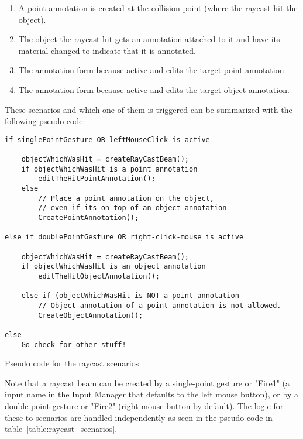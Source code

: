 \begin{enumerate}
    \item A point annotation is created at the collision point (where the raycast hit the object).
    \item The object the raycast hit gets an annotation attached to it and have its material changed to indicate that it is annotated.
    \item The annotation form because active and edits the target point annotation.
    \item The annotation form because active and edits the target object annotation.
\end{enumerate}
 
These scenarios and which one of them is triggered can be summarized with the following pseudo code:

\begin{table}
\label{table:raycast_scenarios}
\begin{lstlisting}
if singlePointGesture OR leftMouseClick is active
    
    objectWhichWasHit = createRayCastBeam();
    if objectWhichWasHit is a point annotation
        editTheHitPointAnnotation();
    else 
        // Place a point annotation on the object, 
        // even if its on top of an object annotation
        CreatePointAnnotation();  

else if doublePointGesture OR right-click-mouse is active   
    
    objectWhichWasHit = createRayCastBeam();
    if objectWhichWasHit is an object annotation
        editTheHitObjectAnnotation();

    else if (objectWhichWasHit is NOT a point annotation
        // Object annotation of a point annotation is not allowed.
        CreateObjectAnnotation(); 

else 
    Go check for other stuff!                                                                 
\end{lstlisting}
\caption[Pseudo code for the raycast scenarios]{Pseudo code for the raycast scenarios} 
\end{table}

Note that a raycast beam can be created by a single-point gesture or "Fire1" (a input name in the Input Manager that defaults to the left mouse button), or 
by a double-point gesture or "Fire2" (right mouse button by default). The logic for these to scenarios are handled independently as seen in the pseudo code in 
table~\vref{table:raycast_scenarios}. %

